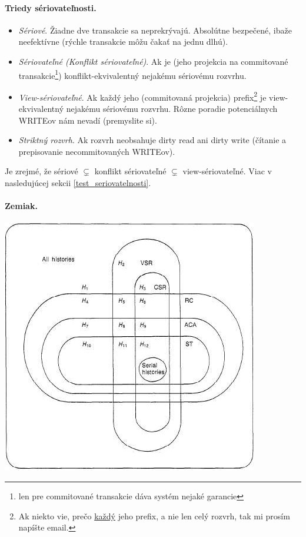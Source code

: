\documentclass[10pt,a4paper]{article}
\begin{document}
\paragraph{Triedy sériovateľnosti.}
\begin{itemize}
\item \emph{Sériové}. Žiadne dve transakcie sa neprekrývajú. Absolútne bezpečené, ibaže neefektívne (rýchle transakcie môžu čakať na jednu dlhú).
\item \emph{Sériovateľné (Konflikt sériovateľné)}. Ak je (jeho projekcia na commitované transakcie\footnote{len pre commitované transakcie dáva systém nejaké garancie}) konflikt-ekvivalentný nejakému sériovému rozvrhu.
\item \emph{View-sériovateľné}. Ak každý jeho (commitovaná projekcia) prefix\footnote{Ak niekto vie, prečo \underline{každý} jeho prefix, a nie len celý rozvrh, tak mi prosím napíšte email.} je view-ekvivalentný nejakému sériovému rozvrhu. Rôzne poradie potenciálnych WRITEov nám nevadí (premyslite si).
\item \emph{Striktný rozvrh}. Ak rozvrh neobsahuje dirty read ani dirty write (čítanie a prepisovanie necommitovaných WRITEov).
\end{itemize}

Je zrejmé, že sériové $\subsetneq$ konflikt sériovateľné $\subsetneq$ view-sériovateľné.
Viac v nasledujúcej sekcii \ref{test_seriovatelnosti}.

\paragraph{Zemiak.}
\begin{center}
\includegraphics[scale=0.5]{db_triedy_seriovatelnosti.png}
\end{center}
\end{document}

